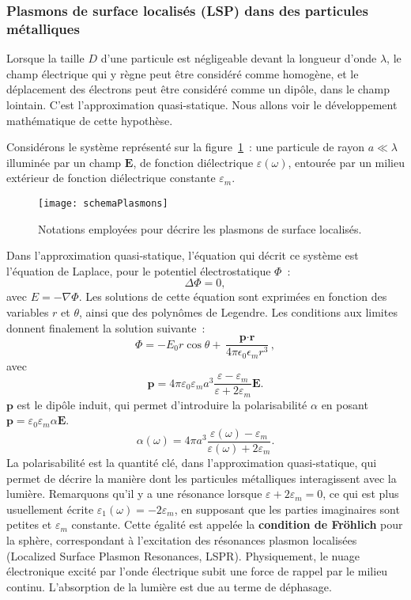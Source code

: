 		\subsubsection{Plasmons de surface localisés (LSP) dans des particules métalliques}
Lorsque la taille $D$ d'une particule est négligeable devant la longueur d'onde $\lambda$, le champ électrique qui y règne peut être considéré comme homogène, et le déplacement des électrons peut être considéré comme un dipôle, dans le champ lointain. C'est l'approximation quasi-statique. Nous allons voir le développement mathématique de cette hypothèse.\par 
Considérons le système représenté sur la figure~\ref{schemaPlasmons}~: une particule de rayon $a\ll \lambda$ illuminée
par un champ $\textbf{E}$, de fonction diélectrique $\varepsilon(\omega)$, entourée par un milieu extérieur de
fonction diélectrique constante $\varepsilon_m$.\par 
\begin{figure}[!htb]
	\centering
	\texttt{[image: schemaPlasmons]}
	\caption{Notations employées pour décrire les plasmons de surface localisés.}
	\label{schemaPlasmons}
\end{figure}
Dans l'approximation quasi-statique, l'équation qui décrit ce système est l'équation de Laplace, pour le potentiel électrostatique $\Phi$~:
\begin{equation}
\Delta\Phi = 0,
\end{equation}
avec $E = -\nabla\Phi$. Les solutions de cette équation sont exprimées en fonction des variables $r$ et $\theta$, ainsi que des polynômes de Legendre. Les conditions aux limites donnent finalement la solution suivante~:
\begin{equation}
\Phi = - E_0r\cos \theta + \dfrac{\textbf{p}\cdot \textbf{r}}{4\pi\epsilon_0\epsilon_mr^3},
\end{equation}
avec
\begin{equation}
\textbf{p}= 4\pi \varepsilon_0 \varepsilon_m a^3 \dfrac{\varepsilon-\varepsilon_m}{\varepsilon+2\varepsilon_m}\textbf{E}.
\end{equation}
$\textbf{p}$ est le dipôle induit, qui permet d'introduire la polarisabilité $\alpha$ en posant $\textbf{p} = \varepsilon_0 \varepsilon_m\alpha \textbf{E}$.
\begin{equation}
\alpha(\omega) = 4\pi a^3\dfrac{\varepsilon(\omega)-\varepsilon_m}{\varepsilon(\omega)+2\varepsilon_m}.
\end{equation}
La polarisabilité est la quantité clé, dans l'approximation quasi-statique, qui permet de décrire la manière dont les particules métalliques interagissent avec la lumière. Remarquons qu'il y a une résonance lorsque $\varepsilon+2\varepsilon_m=0$, ce qui est plus usuellement écrite $\varepsilon_1(\omega) = -2\varepsilon_m$, en supposant que les parties imaginaires sont petites et $\varepsilon_m$ constante. Cette égalité est appelée la \textbf{condition de Fröhlich} pour la sphère, correspondant à l'excitation des résonances plasmon localisées (Localized Surface Plasmon Resonances, LSPR). Physiquement, le nuage électronique excité par l'onde électrique subit une force de rappel par le milieu continu.  L'absorption de la lumière est due au terme de déphasage.\par 
